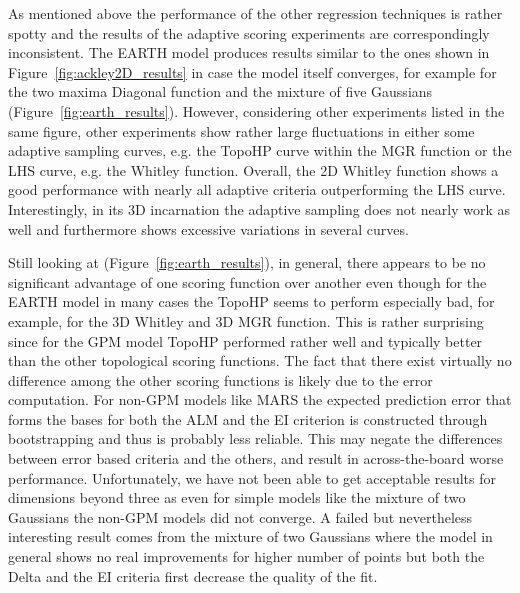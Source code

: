 As mentioned above the performance of the other regression techniques is rather spotty and the results of the adaptive scoring experiments are correspondingly inconsistent.
%
The EARTH model produces results similar to the ones shown in Figure~\ref{fig:ackley2D_results} in case the model itself converges, for example for the two maxima Diagonal function and the mixture of five Gaussians (Figure~\ref{fig:earth_results}).
%
However, considering other experiments listed in the same figure, other experiments show rather large fluctuations in either some adaptive sampling curves, e.g. the TopoHP curve within the MGR function or the LHS curve, e.g. the Whitley function.
%
Overall, the 2D Whitley function shows a good performance with nearly all adaptive criteria outperforming the LHS curve.
%
Interestingly, in its 3D incarnation the adaptive sampling does not nearly work as well and furthermore shows excessive variations in several curves.

Still looking at (Figure~\ref{fig:earth_results}), in general, there appears to be no significant advantage of one scoring function over another even though for the EARTH model in many cases the TopoHP seems to perform especially bad, for example, for the 3D Whitley and 3D MGR function.
%
This is rather surprising since for the GPM model TopoHP performed rather well and typically better than the other topological scoring functions.
%
The fact that there exist virtually no difference among the other scoring functions is likely due to the error computation.
%
For non-GPM models like MARS the expected prediction error that forms the bases for both the ALM and the EI criterion is constructed through bootstrapping and thus is probably less reliable.
%
This may negate the differences between error based criteria and the others, and result in across-the-board worse performance.
%
Unfortunately, we have not been able to get acceptable results for dimensions beyond three as even for simple models like the mixture of two Gaussians the non-GPM models did not converge.
%
A failed but nevertheless interesting result comes from the mixture of two Gaussians where the model in general shows no real improvements for higher number of points but both the Delta and the EI criteria first decrease the quality of the fit.

